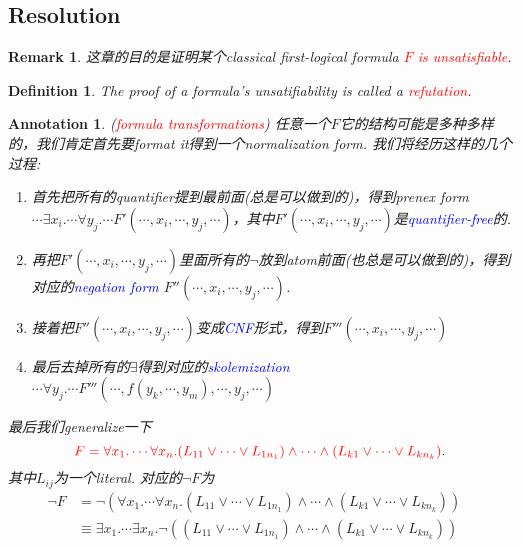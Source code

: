\documentclass{article}
\theoremstyle{plain}
\newtheorem{definition}[theorem]{Definition}
\newtheorem{remark}[theorem]{Remark}
\newtheorem{annotation}[theorem]{Annotation}
\theoremstyle{nonumberplain}
\newcommand{\redt}[1]{\textcolor{red}{#1}}
\newcommand{\bluet}[1]{\textcolor{blue}{#1}}
\begin{document}
\newpage
\subsection{Resolution}

\begin{remark}
\rm 这章的目的是证明某个classical first-logical formula \redt{$F$ is unsatisfiable}.
\end{remark}

\begin{definition}
\rm The proof of a formula's unsatifiability is called a \redt{refutation}.
\end{definition}

\begin{annotation}
\rm (\redt{formula transformations}) 任意一个$F$它的结构可能是多种多样的，我们肯定首先要format it得到一个normalization form. 我们将经历这样的几个过程:
\begin{enumerate}
	\item 首先把所有的quantifier提到最前面(总是可以做到的)，得到prenex form $\cdots\exists x_i. \cdots \forall y_j. \cdots F'(\cdots, x_i,\cdots,y_j,\cdots)$，其中$F'(\cdots,x_i,\cdots,y_j,\cdots)$是\bluet{quantifier-free}的.
	\item 再把$F'(\cdots,x_i,\cdots,y_j,\cdots)$里面所有的$\neg$放到atom前面(也总是可以做到的)，得到对应的\bluet{negation form} $F''(\cdots, x_i,\cdots,y_j,\cdots)$.
	\item 接着把$F''(\cdots, x_i,\cdots,y_j,\cdots)$变成\bluet{CNF}形式，得到$F'''(\cdots, x_i,\cdots,y_j,\cdots)$
	\item 最后去掉所有的$\exists$得到对应的\bluet{skolemization} $\cdots \forall y_j. \cdots F'''(\cdots,f(y_k,\cdots,y_m),\cdots,y_j,\cdots)$  
\end{enumerate}
最后我们generalize一下
\[
	\redt{F = \forall x_1. \cdots \forall x_n.(L_{11} \vee \cdots \vee L_{1n_1})\wedge  \cdots \wedge (L_{k1} \vee \cdots \vee L_{kn_k})}.
\]
其中$L_{ij}$为一个literal. 对应的$\neg F$为
\begin{equation} \label{eq:1}
	\begin{aligned}
	\neg F &= \neg(\forall x_1. \cdots \forall x_n.(L_{11} \vee \cdots \vee L_{1n_1})\wedge  \cdots \wedge (L_{k1} \vee \cdots \vee L_{kn_k})) \\
	&\equiv \exists x_1. \cdots \exists x_n. \neg((L_{11} \vee \cdots \vee L_{1n_1})\wedge  \cdots \wedge (L_{k1} \vee \cdots \vee L_{kn_k})) &  
	\end{aligned}	
\end{equation}
\end{annotation}
\end{document}

